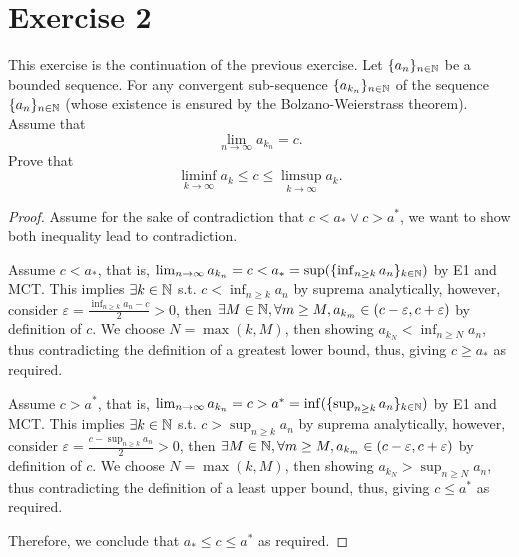 \documentclass{homework}
\newcommand{\N}{\bb{N}} %
\newcommand{\ra}{\rightarrow}
\newcommand{\?}{\stackrel{?}{=}}
\newcommand{\ep}{\varepsilon}
\theoremstyle{definition}
\begin{document}
\newpage
\section*{Exercise 2}
This exercise is the continuation of the previous exercise.
\question[1] Let $\{a_n\}_{n\in\N}$ be a bounded sequence. For any convergent sub-sequence $\{a_{k_n}\}_{n\in\N}$ of the sequence $\{a_n\}_{n\in\N}$ (whose existence is ensured by the Bolzano-Weierstrass theorem). Assume that $$\lim_{n\ra\infty}a_{k_n}=c.$$ Prove that $$\liminf_{k\ra\infty}a_k\leq c\leq \limsup_{k\ra\infty}a_k.$$
\begin{proof}

    
     Assume for the sake of contradiction that $c<a_*\lor c>a^*$, we want to show both inequality lead to contradiction.

     Assume $c<a_*$, that is, $\lim_{n\ra\infty}a_{k_n}=c<a_*=\sup(\{\inf_{n\geq k}a_n\}_{k\in\N})$ by E1 and MCT. This implies $\exists k\in\N$ s.t. $c<\inf_{n\geq k}a_n$ by suprema analytically, however, consider $\ep=\frac{\inf_{n\geq k}a_n-c}{2}>0$, then $\exists M\in\N,\forall m\geq M, a_{k_m}\in(c-\ep, c+\ep)$ by definition of $c$. We choose $N=\max(k,M)$, then showing $a_{k_N}<\inf_{n\geq N}a_n$, thus contradicting the definition of a greatest lower bound, thus, giving $c\geq a_*$ as required.

     Assume $c>a^*$, that is, $\lim_{n\ra\infty}a_{k_n}=c>a^*=\inf(\{\sup_{n\geq k}a_n\}_{k\in\N})$ by E1 and MCT. This implies $\exists k\in\N$ s.t. $c>\sup_{n\geq k}a_n$ by suprema analytically, however, consider $\ep=\frac{c-\sup_{n\geq k}a_n}{2}>0$, then $\exists M\in\N,\forall m\geq M, a_{k_m}\in(c-\ep, c+\ep)$ by definition of $c$. We choose $N=\max(k,M)$, then showing $a_{k_N}>\sup_{n\geq N}a_n$, thus contradicting the definition of a least upper bound, thus, giving $c\leq a^*$ as required.

     Therefore, we conclude that $a_*\leq c\leq a^*$ as required. 
\end{proof}
\end{document}
